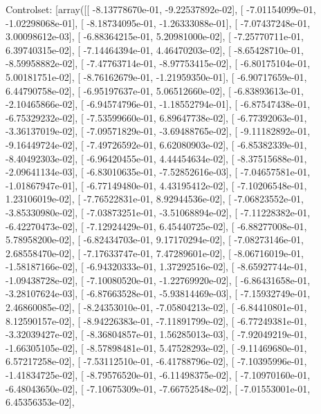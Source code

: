 \documentclass{article}
\begin{document}
Controlset: [array([[ -8.13778670e-01,  -9.22537892e-02],
       [ -7.01154099e-01,  -1.02298068e-01],
       [ -8.18734095e-01,  -1.26333088e-01],
       [ -7.07437248e-01,   3.00098612e-03],
       [ -6.88364215e-01,   5.20981000e-02],
       [ -7.25770711e-01,   6.39740315e-02],
       [ -7.14464394e-01,   4.46470203e-02],
       [ -8.65428710e-01,  -8.59958882e-02],
       [ -7.47763714e-01,  -8.97753415e-02],
       [ -6.80175104e-01,   5.00181751e-02],
       [ -8.76162679e-01,  -1.21959350e-01],
       [ -6.90717659e-01,   6.44790758e-02],
       [ -6.95197637e-01,   5.06512660e-02],
       [ -6.83893613e-01,  -2.10465866e-02],
       [ -6.94574796e-01,  -1.18552794e-01],
       [ -6.87547438e-01,  -6.75329232e-02],
       [ -7.53599660e-01,   6.89647738e-02],
       [ -6.77392063e-01,  -3.36137019e-02],
       [ -7.09571829e-01,  -3.69488765e-02],
       [ -9.11182892e-01,  -9.16449724e-02],
       [ -7.49726592e-01,   6.62080903e-02],
       [ -6.85382339e-01,  -8.40492303e-02],
       [ -6.96420455e-01,   4.44454634e-02],
       [ -8.37515688e-01,  -2.09641134e-03],
       [ -6.83010635e-01,  -7.52852616e-03],
       [ -7.04657581e-01,  -1.01867947e-01],
       [ -6.77149480e-01,   4.43195412e-02],
       [ -7.10206548e-01,   1.23106019e-02],
       [ -7.76522831e-01,   8.92944536e-02],
       [ -7.06823552e-01,  -3.85330980e-02],
       [ -7.03873251e-01,  -3.51068894e-02],
       [ -7.11228382e-01,  -6.42270473e-02],
       [ -7.12924429e-01,   6.45440725e-02],
       [ -6.88277008e-01,   5.78958200e-02],
       [ -6.82434703e-01,   9.17170294e-02],
       [ -7.08273146e-01,   2.68558470e-02],
       [ -7.17633747e-01,   7.47289601e-02],
       [ -8.06716019e-01,  -1.58187166e-02],
       [ -6.94320333e-01,   1.37292516e-02],
       [ -8.65927744e-01,  -1.09438728e-02],
       [ -7.10080520e-01,  -1.22769920e-02],
       [ -6.86431658e-01,  -3.28107624e-03],
       [ -6.87663528e-01,  -5.93814469e-03],
       [ -7.15932749e-01,   2.46860085e-02],
       [ -8.24353010e-01,  -7.05804213e-02],
       [ -6.84410801e-01,   8.12590157e-02],
       [ -8.94226383e-01,  -7.11891799e-02],
       [ -6.77249381e-01,  -3.32039427e-02],
       [ -8.36804857e-01,   1.56285013e-03],
       [ -7.92049219e-01,  -1.66305105e-02],
       [ -8.57898481e-01,   5.47528293e-02],
       [ -9.11469680e-01,   6.57217258e-02],
       [ -7.53112510e-01,  -6.41788796e-02],
       [ -7.10395996e-01,  -1.41834725e-02],
       [ -8.79576520e-01,  -6.11498375e-02],
       [ -7.10970160e-01,  -6.48043650e-02],
       [ -7.10675309e-01,  -7.66752548e-02],
       [ -7.01553001e-01,   6.45356353e-02],
\end{document}
